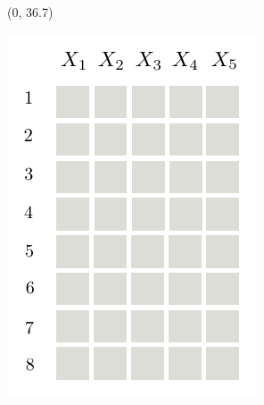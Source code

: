 \documentclass[final]{beamer}
\begin{document}
\begin{frame}{}
\begin{textblock}{25.7}
 
  \end{textblock}
  
  
  \begin{textblock}{60}(0, 36.7)
    \small
    \begin{minipage}[t][][t]{5.67cm}
      \includegraphics[width=\linewidth]{figures/grid-0}
    \end{minipage}\hspace{30pt}\begin{minipage}[t]{4.986cm}

\end{minipage}
\end{textblock}
\end{frame}
\end{document}
